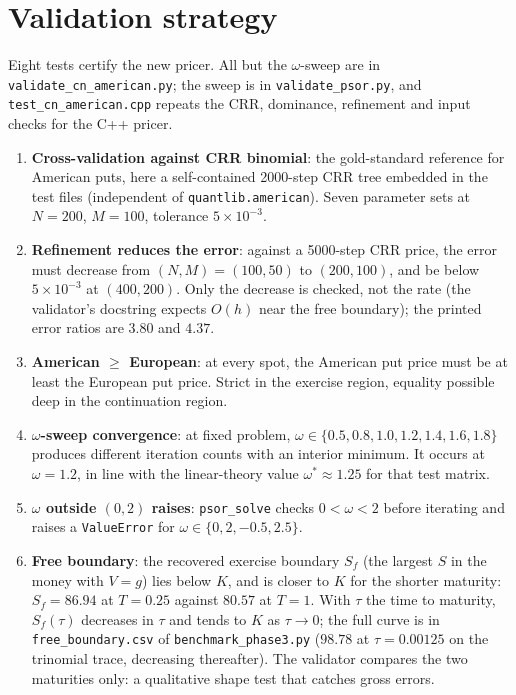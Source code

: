 \documentclass[11pt,a4paper]{article}
\begin{document}
\section{Validation strategy}

Eight tests certify the new pricer. All but the $\omega$-sweep are in
\texttt{validate\_cn\_american.py}; the sweep is in
\texttt{validate\_psor.py}, and \texttt{test\_cn\_american.cpp} repeats
the CRR, dominance, refinement and input checks for the C++ pricer.

\begin{enumerate}[leftmargin=2em]
\item \textbf{Cross-validation against CRR binomial}: the
gold-standard reference for American puts, here a self-contained
2000-step CRR tree embedded in the test files (independent of
\texttt{quantlib.american}). Seven parameter sets at $N = 200$,
$M = 100$, tolerance $5\times10^{-3}$.

\item \textbf{Refinement reduces the error}: against a 5000-step CRR
price, the error must decrease from $(N, M) = (100, 50)$ to
$(200, 100)$, and be below $5\times10^{-3}$ at $(400, 200)$. Only the
decrease is checked, not the rate (the validator's docstring expects
$O(h)$ near the free boundary); the printed error ratios are $3.80$
and $4.37$.

\item \textbf{American $\geq$ European}: at every spot, the American
put price must be at least the European put price. Strict in the
exercise region, equality possible deep in the continuation region.

\item \textbf{$\omega$-sweep convergence}: at fixed problem,
$\omega \in \{0.5, 0.8, 1.0, 1.2, 1.4, 1.6, 1.8\}$ produces different
iteration counts with an interior minimum. It occurs at $\omega = 1.2$,
in line with the linear-theory value $\omega^* \approx 1.25$ for that
test matrix.

\item \textbf{$\omega$ outside $(0, 2)$ raises}: \texttt{psor\_solve}
checks $0 < \omega < 2$ before iterating and raises a
\texttt{ValueError} for $\omega \in \{0, 2, -0.5, 2.5\}$.

\item \textbf{Free boundary}: the recovered exercise boundary $S_f$
(the largest $S$ in the money with $V = g$) lies below $K$, and is
closer to $K$ for the shorter maturity: $S_f = 86.94$ at $T = 0.25$
against $80.57$ at $T = 1$. With $\tau$ the time to maturity, $S_f(\tau)$
decreases in $\tau$ and tends to $K$ as $\tau \to 0$; the full curve is
in \texttt{free\_boundary.csv} of \texttt{benchmark\_phase3.py}
($98.78$ at $\tau = 0.00125$ on the trinomial trace, decreasing
thereafter). The validator compares the two maturities only: a
qualitative shape test that catches gross errors.


\end{enumerate}
\end{document}
